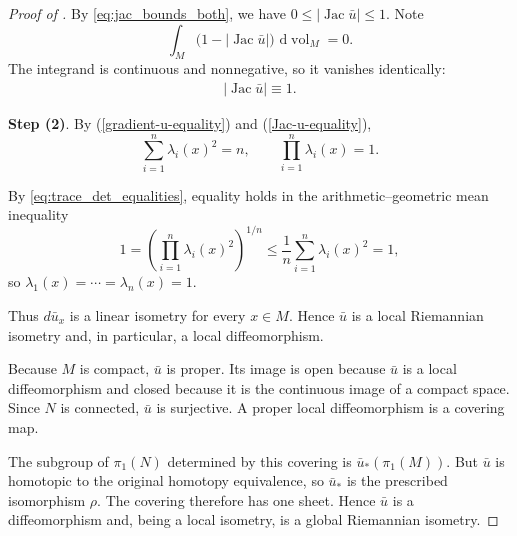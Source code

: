\documentclass[11pt]{amsart}
\theoremstyle{plain}
\theoremstyle{plain}
\theoremstyle{plain}
\newcommand{\Jac}{\operatorname{Jac}}
\newcommand{\dd}{\,\mathrm{d}}
\numberwithin{equation}{section}
\begin{document}
\begin{proof}[Proof of ]
By \eqref{eq:jac_bounds_both}, we have 
\(0\leq|\Jac\bar u|\leq1\). Note
\[
\int_M\bigl(1-|\Jac\bar u|\bigr)
\,\dd\operatorname{vol}_M=0.
\]
The integrand is continuous and nonnegative, so it vanishes identically:
\begin{align}
|\Jac\bar u|\equiv1. \label{Jac-u-equality}
\end{align}

\textbf{Step (2)}. By (\ref{gradient-u-equality}) and (\ref{Jac-u-equality}), 
\begin{equation}\label{eq:trace_det_equalities}
\sum_{i=1}^n\lambda_i(x)^2=n,
\qquad
\prod_{i=1}^n\lambda_i(x)=1.
\end{equation}

By \eqref{eq:trace_det_equalities}, equality holds in the
arithmetic--geometric mean inequality
\[
1
=
\left(\prod_{i=1}^n\lambda_i(x)^2\right)^{1/n}
\leq
\frac1n\sum_{i=1}^n\lambda_i(x)^2
=
1,
\]
so $\lambda_1(x)=\cdots=\lambda_n(x)=1.$

Thus \(d\bar u_x\) is a linear isometry for every \(x\in M\).  Hence
\(\bar u\) is a local Riemannian isometry and, in particular, a local
diffeomorphism.

Because \(M\) is compact, \(\bar u\) is proper.  Its image is open because
\(\bar u\) is a local diffeomorphism and closed because it is the continuous
image of a compact space.  Since \(N\) is connected, \(\bar u\) is
surjective.  A proper local diffeomorphism is a covering map.  

The subgroup of \(\pi_1(N)\) determined by this covering is
\(\bar u_*(\pi_1(M))\).  But \(\bar u\) is homotopic to the original
homotopy equivalence, so \(\bar u_*\) is the prescribed isomorphism
\(\rho\).  The covering therefore has one sheet.  Hence \(\bar u\) is a
diffeomorphism and, being a local isometry, is a global Riemannian isometry.
\end{proof}

\end{document}
